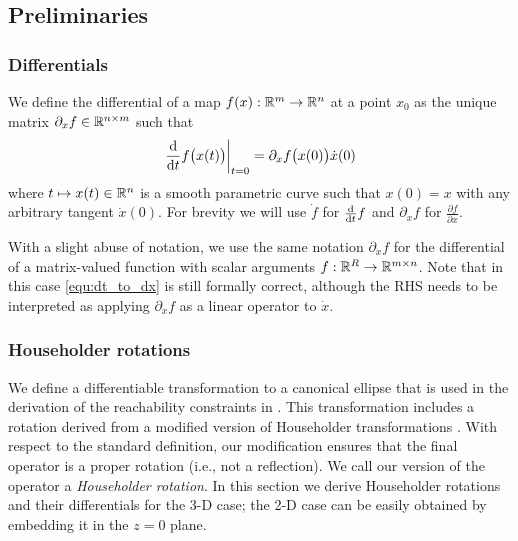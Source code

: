 \documentclass[10pt,twocolumn,twoside]{IEEEtran}
\begin{document}
\subsection{Preliminaries}
\subsubsection{Differentials}
We define the differential of a map $f(x):\mathbb{R}^{m}{}\to\mathbb{R}^{n}{}$ at a point $x_0$ as the unique matrix $\partial_x f \in\mathbb{R}^{n\times m}{}$ such that
\begin{equation}\label{equ:dt_to_dx}
  \left.\frac{\mathrm{d} }{\mathrm{d} t} f\bigl(x(t)\bigr)\right|_{t=0}=\partial_x f\bigl(x(0)\bigr) \dot{x}(0)
\end{equation}
where $t\mapsto x(t)\in\mathbb{R}^{n}{}$ is a smooth parametric curve such that $x(0)=x$ with any arbitrary tangent $\dot{x}(0)$. For brevity we will use $\dot f$ for $\frac{\mathrm{d} }{\mathrm{d} t} f$ and $\partial_x f$ for $\frac{\partial f}{\partial x}$. 

With a slight abuse of notation, we use the same notation $\partial_xf$ for the differential of a matrix-valued function with scalar arguments $f:\mathbb{R}^{R}{}\to\mathbb{R}^{m\times n}{}$.  Note that in this case \eqref{equ:dt_to_dx} is still formally correct, although the RHS needs to be interpreted as applying $\partial_x f$ as a linear operator to $\dot{x}$.

 \subsubsection{Householder rotations}\label{sec:householder}
  We define a differentiable transformation to a canonical ellipse that is used in the derivation of the reachability constraints in . This transformation includes a rotation derived from a modified version of Householder transformations \cite{householder1958unitary}. With respect to the standard definition, our modification ensures that the final operator is a proper rotation (i.e., not a reflection). We call our version of the operator a \emph{Householder rotation}. In this section we derive Householder rotations and their differentials for the 3-D case; the 2-D case can be easily obtained by embedding it in the $z=0$ plane.
\end{document}
